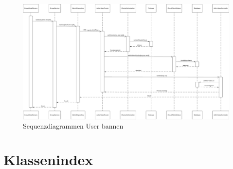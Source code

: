 \documentclass{entwurfsheft}
\begin{document}
        \begin{figure}[htp]
            \centering
            \includegraphics[width = \linewidth]{images/processDescription/SequenzdiagrammBanUser.pdf}
            \caption{Sequenzdiagrammen User bannen}
        \end{figure}

    \newpage 

\newpage
\section{Klassenindex}
\end{document}
